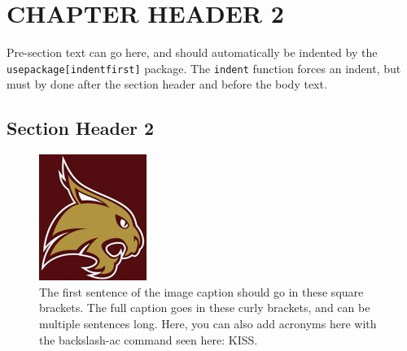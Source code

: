 \chapter{CHAPTER HEADER 2}\label{ch:change_this_2}






\setlength{\parindent}{10mm} %
\indent Pre-section text can go here, and should automatically be indented by the \texttt{usepackage[indentfirst]} package. The \texttt{indent} function forces an indent, but must by done after the section header and before the body text.




\flushleft
\section*{Section Header 2}


\setlength{\parindent}{10mm} %
\indent \lipsum[6-7]


\begin{figure}[t]
    \renewcommand\thefigure{2.}
    \centering                 
    \includegraphics[scale=1]{Figs/Picture2.jpg}
    \captionsetup{font=small}
    \caption[The first sentence of the image caption should go in these square brackets.]{The first sentence of the image caption should go in these square brackets. The full caption goes in these curly brackets, and can be multiple sentences long. Here, you can also add acronyms here with the backslash-ac command seen here: \ac{KISS}.}
    \label{fig:pic2}
\end{figure}


\setlength{\parindent}{10mm}
\lipsum[8-9]




\pagebreak